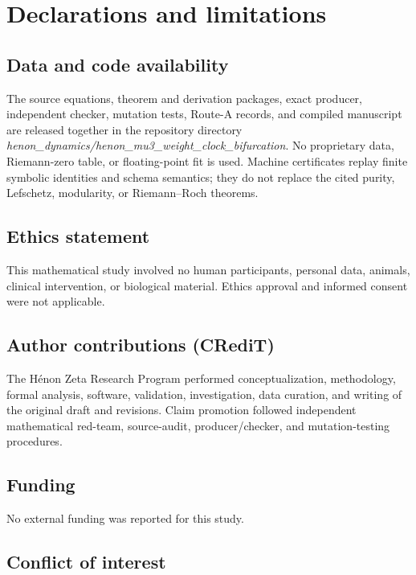 \section*{Declarations and limitations}

\subsection*{Data and code availability}

The source equations, theorem and derivation packages, exact producer,
independent checker, mutation tests, Route-A records, and compiled
manuscript are released together in the repository directory
\emph{henon\_dynamics/henon\_mu3\_weight\_clock\_bifurcation}.  No
proprietary data, Riemann-zero table, or floating-point fit is used.
Machine certificates replay finite symbolic identities and schema
semantics; they do not replace the cited purity, Lefschetz, modularity, or
Riemann--Roch theorems.

\subsection*{Ethics statement}

This mathematical study involved no human participants, personal data,
animals, clinical intervention, or biological material.  Ethics approval
and informed consent were not applicable.

\subsection*{Author contributions (CRediT)}

The H\'enon Zeta Research Program performed conceptualization, methodology,
formal analysis, software, validation, investigation, data curation, and
writing of the original draft and revisions.  Claim promotion followed
independent mathematical red-team, source-audit, producer/checker, and
mutation-testing procedures.

\subsection*{Funding}

No external funding was reported for this study.

\subsection*{Conflict of interest}

